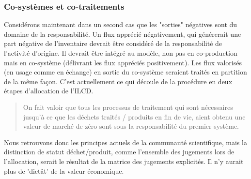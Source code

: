 \subsubsection{Co-systèmes et co-traitements}
Considérons maintenant dans un second cas que les "sorties" négatives sont du domaine de la responsabilité.
Un flux apprécié négativement, qui générerait une part négative de l'inventaire devrait être considéré de la responsabilité de l'activité d'origine.
Il devrait être intégré au modèle, non pas en co-production mais en co-système (délivrant les flux appréciés positivement).
Les flux valorisés (en usage comme en échange) en sortie du co-système seraient traités en partition de la même façon.
C'est actuellement ce qui découle de la procédure en deux étapes d'allocation de l'ILCD.
\blockcquote[traduction p~352-353]{european_commission_ilcd_2010}{
On fait valoir que tous les processus de traitement qui sont nécessaires jusqu'à ce que les déchets traités / produits en fin de vie, aient obtenu une valeur de marché de zéro sont sous la responsabilité du premier système.
}

Nous retrouvons donc les principes actuels de la communauté scientifique, mais la distinction de statut déchet/produit, comme l'ensemble des jugements lors de l'allocation, serait le résultat de la matrice des jugements explicités.
Il n'y aurait plus de 'dictât' de la valeur économique.

